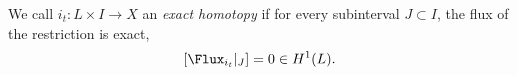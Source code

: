 

    We call $i_t: L\times I \to X$ an \emph{exact homotopy} if for every subinterval $J\subset I$, the flux of the restriction is exact,
    \[[\Flux_{i_{t}}|_J]=0\in H^1(L).\] 

